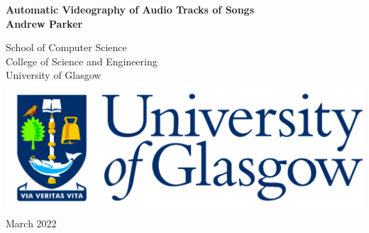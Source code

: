 \documentclass[12pt,titlepage,oneside]{book}
\begin{document}
\begin{titlepage}
\centering
\vspace*{3cm}  %
\bfseries\Large
Automatic Videography of Audio Tracks of Songs\\
\vspace{3cm}
\normalfont\large
Andrew Parker\\
\vspace{2cm}

School of Computer Science\\
College of Science and Engineering\\
University of Glasgow\\
\vspace{2cm}
\includegraphics[scale=0.125]{GlaLogo.pdf}
\\
\vspace{1cm}
March 2022
\end{titlepage}
\frontmatter  %

\tableofcontents
\listoftables
\listoffigures


\mainmatter %







\appendix

\backmatter  



\end{document}
